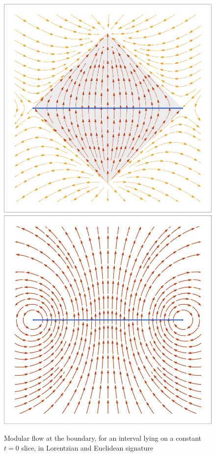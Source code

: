 \documentclass[11pt,a4paper,utf8]{article}
\begin{document}
	\begin{figure}[!ht]
	\centering
	\includegraphics[width=.4\linewidth]{img/modFlowLorentzian.png}
	\hspace{2em}
	\includegraphics[width=.4\linewidth]{img/modFlowEuclidean.png}
	\caption{Modular flow at the boundary, for an interval lying on a constant $t = 0$ slice, in Lorentzian and Euclidean signature}
	\end{figure}
	
\pagebreak[4]
	
\end{document}
